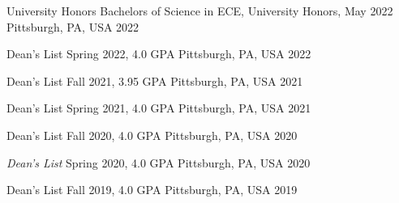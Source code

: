 






\begin{cvhonors}
    

\cvhonor
{University Honors} %
{Bachelors of Science in ECE, University Honors, May 2022} %
{Pittsburgh, PA, USA} %
{2022} %
    

\cvhonor
{Dean's List} %
{Spring 2022, 4.0 GPA} %
{Pittsburgh, PA, USA} %
{2022} %
        
    
\cvhonor
{Dean's List} %
{Fall 2021, 3.95 GPA} %
{Pittsburgh, PA, USA} %
{2021} %

\cvhonor
{Dean's List} %
{Spring 2021, 4.0 GPA} %
{Pittsburgh, PA, USA} %
{2021} %

\cvhonor
{Dean's List} %
{Fall 2020, 4.0 GPA} %
{Pittsburgh, PA, USA} %
{2020} %

\cvhonor
{\emph{Dean's List}} %
{Spring 2020, 4.0 GPA} %
{Pittsburgh, PA, USA} %
{2020} %

\cvhonor
{Dean's List} %
{Fall 2019, 4.0 GPA} %
{Pittsburgh, PA, USA} %
{2019} %

\end{cvhonors}


